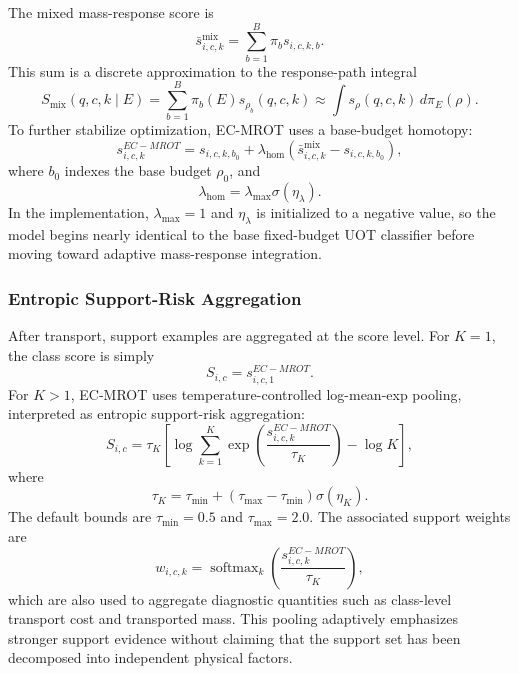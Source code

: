 \documentclass[journal]{IEEEtran}
\newcommand{\method}{EC-MROT}
\newcommand{\1}{\mathbf{1}}
\begin{document}
The mixed mass-response score is
\begin{equation}
    \bar{s}_{i,c,k}^{\mathrm{mix}}
    =
    \sum_{b=1}^{B}\pi_b s_{i,c,k,b}.
\end{equation}
This sum is a discrete approximation to the response-path integral
\begin{equation}
    S_{\mathrm{mix}}(q,c,k \mid E)
    =
    \sum_{b=1}^{B}\pi_b(E)s_{\rho_b}(q,c,k)
    \approx
    \int s_{\rho}(q,c,k)\,d\pi_E(\rho).
\end{equation}
To further stabilize optimization, \method{} uses a base-budget homotopy:
\begin{equation}
    s_{i,c,k}^{\method}
    =
    s_{i,c,k,b_0}
    +
    \lambda_{\mathrm{hom}}
    \left(
        \bar{s}_{i,c,k}^{\mathrm{mix}}
        -
        s_{i,c,k,b_0}
    \right),
    \label{eq:ecot_base_anchor}
\end{equation}
where $b_0$ indexes the base budget $\rho_0$, and
\begin{equation}
    \lambda_{\mathrm{hom}}
    =
    \lambda_{\max}\sigma(\eta_{\lambda}).
\end{equation}
In the implementation, $\lambda_{\max}=1$ and $\eta_{\lambda}$ is initialized to a negative value, so the model begins nearly identical to the base fixed-budget UOT classifier before moving toward adaptive mass-response integration.

\subsubsection{Entropic Support-Risk Aggregation}
After transport, support examples are aggregated at the score level. For $K=1$, the class score is simply
\begin{equation}
    S_{i,c}=s_{i,c,1}^{\method}.
\end{equation}
For $K>1$, \method{} uses temperature-controlled log-mean-exp pooling, interpreted as entropic support-risk aggregation:
\begin{equation}
    S_{i,c}
    =
    \tau_K
    \left[
        \log\sum_{k=1}^{K}
        \exp\left(\frac{s_{i,c,k}^{\method}}{\tau_K}\right)
        -
        \log K
    \right],
    \label{eq:ecot_shot_pooling}
\end{equation}
where
\begin{equation}
    \tau_K
    =
    \tau_{\min}
    +
    (\tau_{\max}-\tau_{\min})\sigma(\eta_K).
\end{equation}
The default bounds are $\tau_{\min}=0.5$ and $\tau_{\max}=2.0$. The associated support weights are
\begin{equation}
    w_{i,c,k}
    =
    \operatorname{softmax}_{k}
    \left(
        \frac{s_{i,c,k}^{\method}}{\tau_K}
    \right),
\end{equation}
which are also used to aggregate diagnostic quantities such as class-level transport cost and transported mass. This pooling adaptively emphasizes stronger support evidence without claiming that the support set has been decomposed into independent physical factors.
\end{document}
